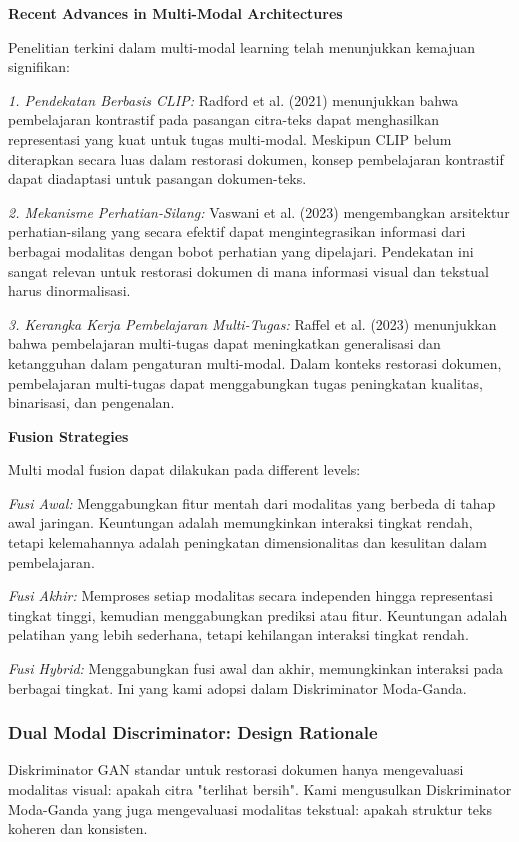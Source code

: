 \documentclass[12pt,a4paper]{article}
\begin{document}
\textbf{Recent Advances in Multi-Modal Architectures}

Penelitian terkini dalam multi-modal learning telah menunjukkan kemajuan signifikan:

\textit{1. Pendekatan Berbasis CLIP:} Radford et al. (2021) menunjukkan bahwa pembelajaran kontrastif pada pasangan citra-teks dapat menghasilkan representasi yang kuat untuk tugas multi-modal. Meskipun CLIP belum diterapkan secara luas dalam restorasi dokumen, konsep pembelajaran kontrastif dapat diadaptasi untuk pasangan dokumen-teks.

\textit{2. Mekanisme Perhatian-Silang:} Vaswani et al. (2023) mengembangkan arsitektur perhatian-silang yang secara efektif dapat mengintegrasikan informasi dari berbagai modalitas dengan bobot perhatian yang dipelajari. Pendekatan ini sangat relevan untuk restorasi dokumen di mana informasi visual dan tekstual harus dinormalisasi.

\textit{3. Kerangka Kerja Pembelajaran Multi-Tugas:} Raffel et al. (2023) menunjukkan bahwa pembelajaran multi-tugas dapat meningkatkan generalisasi dan ketangguhan dalam pengaturan multi-modal. Dalam konteks restorasi dokumen, pembelajaran multi-tugas dapat menggabungkan tugas peningkatan kualitas, binarisasi, dan pengenalan.

\textbf{Fusion Strategies}

Multi modal fusion dapat dilakukan pada different levels:

\textit{Fusi Awal:} Menggabungkan fitur mentah dari modalitas yang berbeda di tahap awal jaringan. Keuntungan adalah memungkinkan interaksi tingkat rendah, tetapi kelemahannya adalah peningkatan dimensionalitas dan kesulitan dalam pembelajaran.

\textit{Fusi Akhir:} Memproses setiap modalitas secara independen hingga representasi tingkat tinggi, kemudian menggabungkan prediksi atau fitur. Keuntungan adalah pelatihan yang lebih sederhana, tetapi kehilangan interaksi tingkat rendah.

\textit{Fusi Hybrid:} Menggabungkan fusi awal dan akhir, memungkinkan interaksi pada berbagai tingkat. Ini yang kami adopsi dalam Diskriminator Moda-Ganda.

\subsubsection{Dual Modal Discriminator: Design Rationale}
\label{subsubsec:dual-modal-rationale}

Diskriminator GAN standar untuk restorasi dokumen hanya mengevaluasi modalitas visual: apakah citra "terlihat bersih". Kami mengusulkan Diskriminator Moda-Ganda yang juga mengevaluasi modalitas tekstual: apakah struktur teks koheren dan konsisten.
\end{document}
